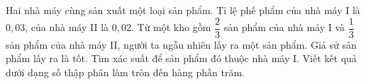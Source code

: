 \begin{ex}
Hai nhà máy cùng sản xuất một loại sản phẩm. Tỉ lệ phế phẩm của nhà máy I là $0{,}03$, của nhà máy II là $0{,}02$. Từ một kho gồm $\dfrac23$ sản phẩm của nhà máy I và $\dfrac13$ sản phẩm của nhà máy II, người ta ngẫu nhiên lấy ra một sản phẩm. Giả sử sản phẩm lấy ra là tốt. Tìm xác suất để sản phẩm đó thuộc nhà máy I. Viết kết quả dưới dạng số thập phân làm tròn đến hàng phần trăm.
\end{ex}
